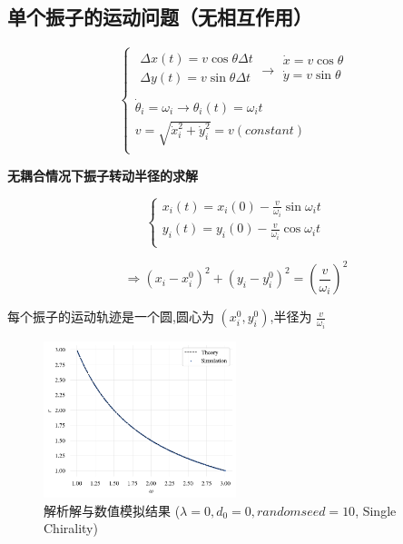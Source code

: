 \documentclass{article}
\begin{document}
\subsection{单个振子的运动问题（无相互作用）}

$$
\begin{cases}
	\begin{array}{c}
	\Delta x\left( t \right) =v\cos \theta \Delta t\\
	\Delta y\left( t \right) =v\sin \theta \Delta t\\
\end{array}\rightarrow \begin{array}{c}
	\dot{x}=v\cos \theta\\
	\dot{y}=v\sin \theta\\
\end{array}\\
	\dot{\theta}_i=\omega _i\rightarrow \theta _i\left( t \right) =\omega _it\\
	v=\sqrt{\dot{x}_{i}^{2}+\dot{y}_{i}^{2}}=v\left( constant \right)\\
\end{cases}
$$

\textbf{无耦合情况下振子转动半径的求解}

$$
\begin{cases}
	x_i\left( t \right) =x_i\left( 0 \right) -\frac{v}{\omega _i}\sin \omega _it\\
	y_i\left( t \right) =y_i\left( 0 \right) -\frac{v}{\omega _i}\cos \omega _it\\
\end{cases}
$$

$$
\Rightarrow \left( x_i-x_{i}^{0} \right) ^2+\left( y_i-y_{i}^{0} \right) ^2=\left( \frac{v}{\omega _i} \right) ^2
$$

每个振子的运动轨迹是一个圆,圆心为 $\left( x_i^0,y_i^0 \right)$,半径为 $\frac{v}{\omega _i}$

\begin{figure}[H]
	\centering
	\includegraphics[width=0.5\textwidth]{./figs/noCouplingRadius.png}
	\caption{解析解与数值模拟结果 ($\lambda=0, d_0=0, random seed=10$, Single Chirality)}
	\label{fig:fig21.1}
\end{figure}
\end{document}
